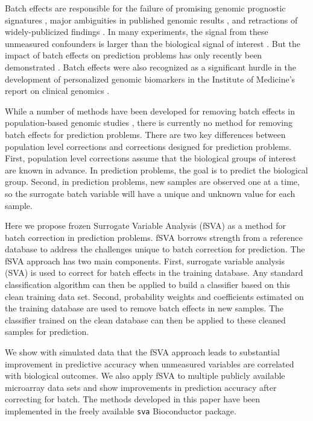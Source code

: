 \documentclass[letterpaper,12pt]{article}\usepackage[]{graphicx}\usepackage[]{color}
\begin{document}
Batch effects are responsible for the failure of promising genomic prognostic signatures \citep{Baggerly2004a,Baggerly2005}, major ambiguities in published genomic results \citep{Spielman2007,Akey2007}, and retractions of widely-publicized findings \citep{Sebastiani2010,Lambert2012}. In many experiments, the signal from these unmeasured confounders is larger than the biological signal of interest \citep{Leek2010}. But the impact of batch effects on prediction problems has only recently been demonstrated \citep{Parker2012,Luo2010}. Batch effects were also recognized as a significant hurdle in the development of personalized genomic biomarkers in the Institute of Medicine's report on clinical genomics \citep{Micheel2012}. 

While a number of methods have been developed for removing batch effects in population-based genomic studies \citep{Johnson2007b,Gagnon-Bartsch2011,Leek2007,Leek2010,Walker2008}, there is currently no method for removing batch effects for prediction problems. There are two key differences between population level corrections and corrections designed for prediction problems. First, population level corrections assume that the biological groups of interest are known in advance. In prediction problems, the goal is to predict the biological group. Second, in prediction problems, new samples are observed one at a time, so the surrogate batch variable will have a unique and unknown value for each sample. 

Here we propose frozen Surrogate Variable Analysis (fSVA) as a method for batch correction in prediction problems. fSVA borrows strength from a reference database to address the challenges unique to batch correction for prediction. The fSVA approach has two main components. First, surrogate variable analysis (SVA) is used to correct for batch effects in the training database. Any standard classification algorithm can then be applied to build a classifier based on this clean training data set. Second, probability weights and coefficients estimated on the training database are used to remove batch effects in new samples. The classifier trained on the clean database can then be applied to these cleaned samples for prediction. 

We show with simulated data that the fSVA approach leads to substantial improvement in predictive accuracy when unmeasured variables are correlated with biological outcomes. We also apply fSVA to multiple publicly available microarray data sets and show improvements in prediction accuracy after correcting for batch. The methods developed in this paper have been implemented in the freely available \texttt{sva} Bioconductor package. 
\end{document}
